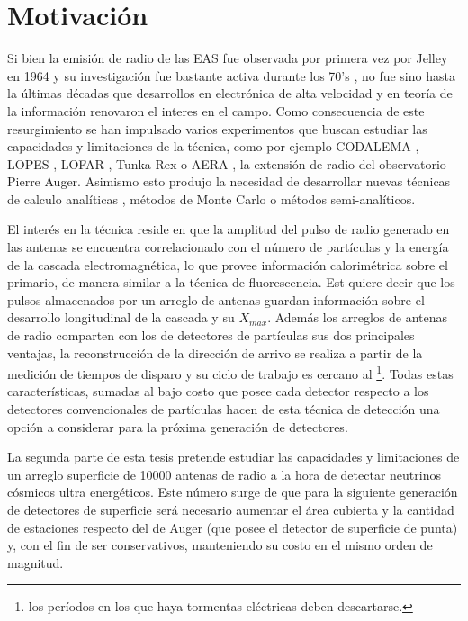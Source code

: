 \chapter{Motivaci\'on}
\label{ch:motRadio}

Si bien la emisi\'on de radio de las EAS fue observada por primera vez por Jelley en 1964 \cite{jelley1966radio} y su investigaci\'on fue bastante activa durante los 70's \cite{allan1971progress}, no fue sino hasta la \'ultimas d\'ecadas que desarrollos en electr\'onica de alta velocidad y en teor\'ia de la informaci\'on renovaron el interes en el campo.
Como consecuencia de este resurgimiento se han impulsado varios experimentos que buscan estudiar las capacidades y limitaciones de la t\'ecnica, como por ejemplo CODALEMA \cite{ardouin2005radio}, LOPES \cite{huege2012lopes}, LOFAR \cite{horandel2009lofar}, Tunka-Rex \cite{schroder2013tunka} o AERA \cite{kelley2011aera}, la extensi\'on de radio del observatorio Pierre Auger.
Asimismo esto produjo la necesidad de desarrollar nuevas t\'ecnicas de calculo anal\'iticas \cite{huege2003radio,scholten2008macroscopic}, m\'etodos de Monte Carlo \cite{huege2007monte,ludwig2011reas3} o m\'etodos semi-anal\'iticos\cite{scholten2009macroscopic}.

El interés en la técnica reside en que la amplitud del pulso de radio generado en las antenas se encuentra correlacionado con el número de partículas y la energía de la cascada electromagnética, lo que provee información calorimétrica sobre el primario, de manera similar a la técnica de fluorescencia.
Est quiere decir que los pulsos almacenados por un arreglo de antenas guardan información sobre el desarrollo longitudinal de la cascada y su $X_{max}$.
Además los arreglos de antenas de radio comparten con los de detectores de partículas sus dos principales ventajas, la reconstrucción de la dirección de arrivo se realiza a partir de la medición de tiempos de disparo y su ciclo de trabajo es cercano al \footnote{los períodos en los que haya tormentas eléctricas deben descartarse.}.
Todas estas características, sumadas al bajo costo que posee cada detector respecto a los detectores convencionales de partículas hacen de esta técnica de detección una opción a considerar para la próxima generación de detectores.

La segunda parte de esta tesis pretende estudiar las capacidades y limitaciones de un arreglo superficie de 10000 antenas de radio a la hora de detectar neutrinos cósmicos ultra energéticos.
Este número surge de que para la siguiente generación de detectores de superficie será necesario aumentar el área cubierta y la cantidad de estaciones respecto del de Auger (que posee el detector de superficie de punta) y, con el fin de ser conservativos, manteniendo su costo en el mismo orden de magnitud.

